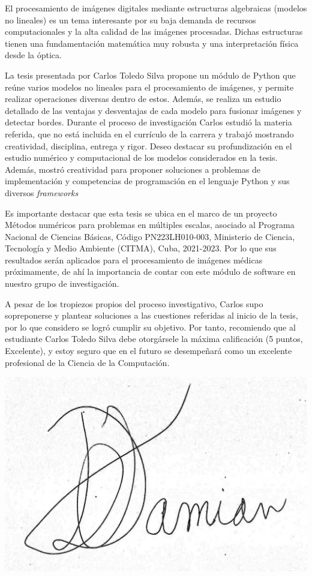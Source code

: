 \begin{opinion}
    El procesamiento de imágenes digitales mediante estructuras algebraicas (modelos no lineales) es un tema interesante por su baja demanda de recursos computacionales y la alta calidad de las imágenes procesadas. Dichas estructuras tienen una fundamentación matemática muy robusta y una interpretación física desde la óptica.
    
    La tesis presentada por Carlos Toledo Silva propone un módulo de Python que reúne varios modelos no lineales para el procesamiento de imágenes, y permite realizar operaciones diversas dentro de estos. Además, se realiza un estudio detallado de las ventajas y desventajas de cada modelo para fusionar imágenes y detectar bordes. Durante el proceso de investigación Carlos estudió la materia referida, que no está incluida en el currículo de la carrera y trabajó mostrando creatividad, disciplina, entrega y rigor. Deseo destacar su profundización en el estudio numérico y computacional de los modelos considerados en la tesis. Además, mostró creatividad para proponer soluciones a problemas de implementación y competencias de programación en el lenguaje Python y sus diversos \textit{frameworks}
    
    Es importante destacar que esta tesis se ubica en el marco de un proyecto Métodos numéricos para problemas en múltiples escalas, asociado al Programa Nacional de Ciencias Básicas, Código PN223LH010-003, Ministerio de Ciencia, Tecnología y Medio Ambiente (CITMA), Cuba, 2021-2023. Por lo que sus resultados serán aplicados para el procesamiento de imágenes médicas próximamente, de ahí la importancia de contar con este módulo de software en nuestro grupo de investigación.
    
    A pesar de los tropiezos propios del proceso investigativo, Carlos supo sopreponerse y plantear soluciones a las cuestiones referidas al inicio de la tesis, por lo que considero se logró cumplir su objetivo.
    Por tanto, recomiendo que al estudiante Carlos Toledo Silva debe otorgársele la máxima calificación (5 puntos, Excelente), y estoy seguro que en el futuro se desempeñará como un excelente profesional de la Ciencia de la Computación.
    
    \begingroup
    \centering
    	\includegraphics[width=5.0 cm]{graphics/firma_del_tutor.jpg}
    	
    \par
    \endgroup
\end{opinion}
